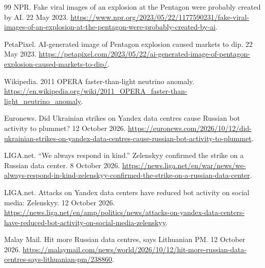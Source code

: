 \documentclass[11pt]{article}
\begin{document}
\begin{thebibliography}{99}
NPR.
Fake viral images of an explosion at the Pentagon were probably created
by AI. 22 May 2023.
\url{https://www.npr.org/2023/05/22/1177590231/fake-viral-images-of-an-explosion-at-the-pentagon-were-probably-created-by-ai}.

PetaPixel.
AI-generated image of Pentagon explosion caused markets to dip.
22 May 2023.
\url{https://petapixel.com/2023/05/22/ai-generated-image-of-pentagon-explosion-caused-markets-to-dip/}.

Wikipedia.
2011 OPERA faster-than-light neutrino anomaly.
\url{https://en.wikipedia.org/wiki/2011_OPERA_faster-than-light_neutrino_anomaly}.

Euronews.
Did Ukrainian strikes on Yandex data centres cause Russian bot activity
to plummet? 12 October 2026.
\url{https://euronews.com/2026/10/12/did-ukrainian-strikes-on-yandex-data-centres-cause-russian-bot-activity-to-plummet}.

LIGA.net.
``We always respond in kind.'' Zelenskyy confirmed the strike on a
Russian data center. 8 October 2026.
\url{https://news.liga.net/en/war/news/we-always-respond-in-kind-zelenskyy-confirmed-the-strike-on-a-russian-data-center}.

LIGA.net.
Attacks on Yandex data centers have reduced bot activity on social
media: Zelenskyy. 12 October 2026.
\url{https://news.liga.net/en/amp/politics/news/attacks-on-yandex-data-centers-have-reduced-bot-activity-on-social-media-zelenskyy}.

Malay Mail.
Hit more Russian data centres, says Lithuanian PM. 12 October 2026.
\url{https://malaymail.com/news/world/2026/10/12/hit-more-russian-data-centres-says-lithuanian-pm/238860}.

\end{thebibliography}
\end{document}
